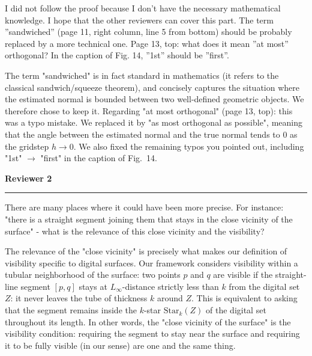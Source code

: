 \documentclass[10pt,french]{letter}
\newcounter{remarkcount}
\newcommand{\reviewer}[1]{%
  \setcounter{remarkcount}{1}%
  \medskip
  \noindent\textbf{\large Reviewer #1}
  \smallskip\par
  \noindent\rule{\linewidth}{0.6pt}
  \medskip
}
\begin{document}
  \begin{remark}
    I did not follow the proof because I don’t have the necessary mathematical knowledge. I hope
    that the other reviewers can cover this part. The term ”sandwiched” (page 11, right column,
    line 5 from bottom) should be probably replaced by a more technical one. Page 13, top: what
    does it mean ”at most” orthogonal? In the caption of Fig. 14, ”1st” should be ”first”.
  \end{remark}
  \begin{response}
    The term "sandwiched" is in fact standard in mathematics (it refers to the classical
    sandwich/squeeze theorem), and concisely captures the situation where the estimated normal
    is bounded between two well-defined geometric objects. We therefore chose to keep it.
    Regarding "at most orthogonal" (page 13, top): this was a typo mistake. We replaced it by
    "as most orthogonal as possible", meaning that the angle between the estimated normal
    and the true normal tends to 0 as the gridstep $h \to 0$. We also fixed the
    remaining typos you pointed out, including "1st" $\to$ "first" in the caption of Fig.~14.
  \end{response}



  \reviewer{2}

  \begin{remark}
    There are many places where it could have been more precise. For instance:
    "there is a straight segment joining them that stays in the close vicinity of
    the surface" - what is the relevance of this close vicinity and the visibility?
  \end{remark}
  \begin{response}
    The relevance of the "close vicinity" is precisely what makes our definition of visibility
    specific to digital surfaces. Our framework considers visibility within a tubular
    neighborhood of the surface: two points $p$ and $q$ are visible if the straight-line segment
    $[p,q]$ stays at $L_\infty$-distance strictly less than $k$ from the digital set $Z$:
    it never leaves the tube of thickness $k$ around $Z$. This is equivalent to asking that the
    segment remains inside the $k$-star $\mathrm{Star}_k(Z)$ of the digital set throughout its
    length. In other words, the "close vicinity of the surface" is the visibility
    condition: requiring the segment to stay near the surface and requiring it to be fully visible
    (in our sense) are one and the same thing.
  \end{response}
\end{document}
